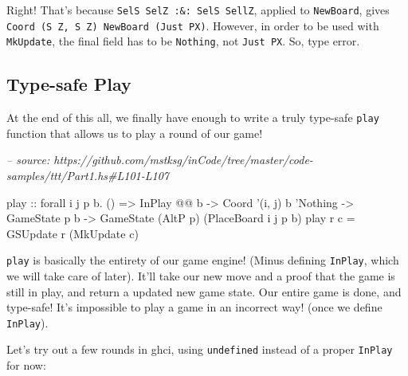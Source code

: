 \documentclass[]{article}
\newenvironment{Shaded}{}{}
\newcommand{\CommentTok}[1]{\textcolor[rgb]{0.38,0.63,0.69}{\textit{#1}}}
\newcommand{\DataTypeTok}[1]{\textcolor[rgb]{0.56,0.13,0.00}{#1}}
\newcommand{\FunctionTok}[1]{\textcolor[rgb]{0.02,0.16,0.49}{#1}}
\newcommand{\NormalTok}[1]{#1}
\newcommand{\OtherTok}[1]{\textcolor[rgb]{0.00,0.44,0.13}{#1}}
\begin{document}
Right! That's because \texttt{SelS\ SelZ\ :\&:\ SelS\ SellZ}, applied to
\texttt{NewBoard}, gives
\texttt{Coord\ \textquotesingle{}(\textquotesingle{}S\ \textquotesingle{}Z,\ \textquotesingle{}S\ \textquotesingle{}Z)\ NewBoard\ (\textquotesingle{}Just\ \textquotesingle{}PX)}.
However, in order to be used with \texttt{MkUpdate}, the final field has to be
\texttt{\textquotesingle{}Nothing}, not
\texttt{\textquotesingle{}Just\ \textquotesingle{}PX}. So, type error.

\hypertarget{type-safe-play}{%
\subsection{Type-safe Play}\label{type-safe-play}}

At the end of this all, we finally have enough to write a truly type-safe
\texttt{play} function that allows us to play a round of our game!

\begin{Shaded}
\begin{Highlighting}[]
\CommentTok{-- source: https://github.com/mstksg/inCode/tree/master/code-samples/ttt/Part1.hs#L101-L107}

\NormalTok{play}
\OtherTok{    ::}\NormalTok{ forall i j p b}\FunctionTok{.}\NormalTok{ ()}
    \OtherTok{=>} \DataTypeTok{InPlay} \FunctionTok{@@}\NormalTok{ b}
    \OtherTok{->} \DataTypeTok{Coord}\NormalTok{ '(i, j) b '}\DataTypeTok{Nothing}
    \OtherTok{->} \DataTypeTok{GameState}\NormalTok{ p b}
    \OtherTok{->} \DataTypeTok{GameState}\NormalTok{ (}\DataTypeTok{AltP}\NormalTok{ p) (}\DataTypeTok{PlaceBoard}\NormalTok{ i j p b)}
\NormalTok{play r c }\FunctionTok{=} \DataTypeTok{GSUpdate}\NormalTok{ r (}\DataTypeTok{MkUpdate}\NormalTok{ c)}
\end{Highlighting}
\end{Shaded}

\texttt{play} is basically the entirety of our game engine! (Minus defining
\texttt{InPlay}, which we will take care of later). It'll take our new move and
a proof that the game is still in play, and return a updated new game state. Our
entire game is done, and type-safe! It's impossible to play a game in an
incorrect way! (once we define \texttt{InPlay}).

Let's try out a few rounds in ghci, using \texttt{undefined} instead of a proper
\texttt{InPlay} for now:
\end{document}
